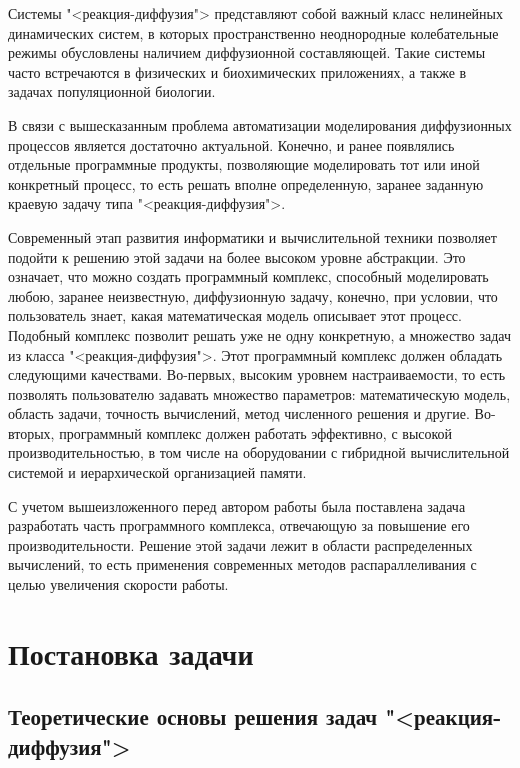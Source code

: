 \documentclass[a4paper, 14pt]{extarticle}
\theoremstyle{definition}
\begin{document}
\par Системы "<реакция-диффузия"> представляют собой важный класс нелинейных динамических систем, в которых пространственно неоднородные колебательные режимы обусловлены наличием диффузионной составляющей. Такие системы часто встречаются в физических и биохимических приложениях, а также в задачах популяционной биологии.

\par В связи с вышесказанным проблема автоматизации моделирования диффузионных процессов является достаточно актуальной. Конечно, и ранее появлялись отдельные программные продукты, позволяющие моделировать тот или иной конкретный процесс, то есть решать вполне определенную, заранее заданную краевую задачу типа "<реакция-диффузия">.

\par Современный этап развития информатики и вычислительной техники позволяет подойти к решению этой задачи на более высоком уровне абстракции. Это означает, что можно создать программный комплекс, способный моделировать любою, заранее неизвестную, диффузионную задачу, конечно, при условии, что пользователь знает, какая математическая модель описывает этот процесс. Подобный комплекс позволит решать уже не одну конкретную, а множество задач из класса "<реакция-диффузия">. Этот программный комплекс должен обладать следующими качествами. Во-первых, высоким уровнем настраиваемости, то есть позволять пользователю задавать множество параметров: математическую модель, область задачи, точность вычислений, метод численного решения и другие. Во-вторых, программный комплекс должен работать эффективно, с высокой производительностью, в том числе на оборудовании с гибридной вычислительной системой и иерархической организацией памяти.

\par С учетом вышеизложенного перед автором работы была поставлена задача разработать часть программного комплекса, отвечающую за повышение его производительности. Решение этой задачи лежит в области распределенных вычислений, то есть применения современных методов распараллеливания с целью увеличения скорости работы.





\section{Постановка задачи}

\subsection{Теоретические основы решения задач "<реакция-диффузия">}
\end{document}

